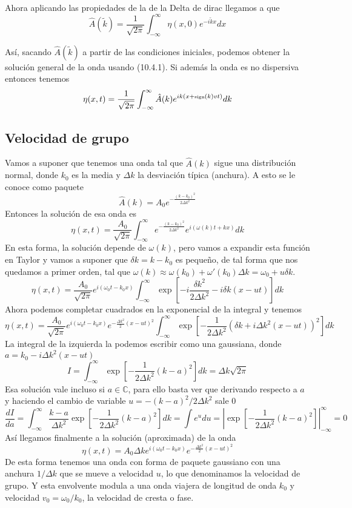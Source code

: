 Ahora aplicando las propiedades de la de la Delta de dirac llegamos a que 
\begin{equation} \label{6.1.1}
    \hat{A}(\tilde{k}) = \frac{1}{\sqrt{2\pi}}\int_{-\infty}^\infty \eta(x,0) e^{-i\tilde{k}x}dx
\end{equation}

Así, sacando $\hat{A}(\tilde{k})$ a partir de las condiciones iniciales, podemos obtener la solución general de la onda usando (10.4.1). Si además la onda es no dispersiva entonces tenemos
\begin{equation} \label{6.1.1}
    \eta(x,t) = \frac{1}{\sqrt{2\pi}} \int_{-\infty}^\infty \hat{A}(k) e^{ik(x+\mbox{\tiny sign}(k) v t)}dk
\end{equation}
\subsection{Velocidad de grupo}
Vamos a suponer que tenemos una onda tal que $\hat{A}(k)$ sigue una distribución normal, donde $k_0$ es la media y $\Delta k$ la desviación típica (anchura). A esto se le conoce como paquete
\[\hat{A}(k) = A_0 e^{-\frac{(k-k_0)^2}{2\Delta k^2}}\]
Entonces la solución de esa onda es
\[\eta(x,t) = \frac{A_0 }{\sqrt{2\pi}} \int_{-\infty}^\infty e^{-\frac{(k-k_0)^2}{2\Delta k^2}} e^{i(\omega(k)t + kx)}dk\]
En esta forma, la solución depende de $\omega(k)$, pero vamos a expandir esta función en Taylor y vamos a suponer que $\delta k = k-k_0$ es pequeño, de tal forma que nos quedamos a primer orden, tal que $\omega(k) \approx \omega(k_0) + \omega'(k_0) \Delta k = \omega_0 + u \delta k$.
\[\eta(x,t) = \frac{A_0 }{\sqrt{2\pi}} e^{i(\omega_0 t - k_0 x)}\int_{-\infty}^\infty \exp\left[-i\frac{\delta k^2}{2\Delta k^2}-i\delta k(x-ut)\right]dk\]
Ahora podemos completar cuadrados en la exponencial de la integral y tenemos
\[\eta(x,t) = \frac{A_0 }{\sqrt{2\pi}} e^{i(\omega_0 t - k_0 x)}e^{-\frac{\Delta k^2}{2}(x-ut)^2}\int_{-\infty}^\infty \exp\left[-\frac{1}{2\Delta k^2}\left(\delta k+ i\Delta k^2 (x-ut)\right)^2\right]dk\]
La integral de la izquierda la podemos escribir como una gaussiana, donde $a =  k_0 -i\Delta k^2 (x-ut)$
\[I = \int_{-\infty}^\infty \exp\left[-\frac{1}{2\Delta k^2}\left(k-a\right)^2\right]dk = \Delta k \sqrt{2\pi}\]
Esa solución vale incluso si $a\in \mathbb{C}$, para ello basta ver que derivando respecto a $a$ y haciendo el cambio de variable $u = -(k-a)^2/2\Delta k ^2$ sale 0
\[\frac{dI}{da} = \int_{-\infty}^\infty \frac{k-a}{\Delta k^2} \exp\left[-\frac{1}{2\Delta k^2}\left(k-a\right)^2\right] dk = \int e^u du = \left|\exp\left[-\frac{1}{2\Delta k^2}\left(k-a\right)^2\right]\right|_{-\infty}^\infty = 0\]
Así llegamos finalmente a la solución (aproximada) de la onda
\begin{equation} \label{6.1.1}
    \eta(x,t) = A_0 \Delta k e^{i(\omega_0 t - k_0 x)}e^{-\frac{\Delta k^2}{2}(x-ut)^2}
\end{equation}
De esta forma tenemos una onda con forma de paquete gaussiano con una anchura $1/\Delta k$ que se mueve a velocidad $u$, lo que denominamos la velocidad de grupo. Y esta envolvente modula a una onda viajera de longitud de onda $k_0$ y velocidad $v_0 = \omega_0/k_0$, la velocidad de cresta o fase.

